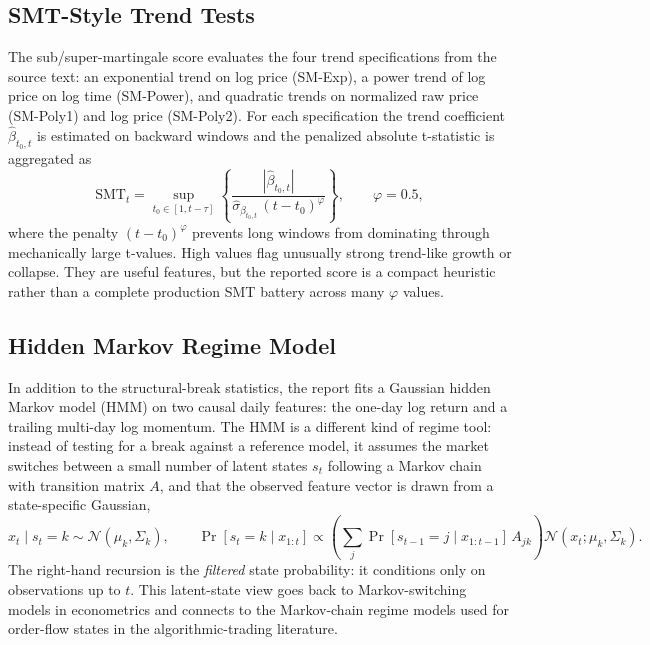 \documentclass[11pt]{article}
\begin{document}
\subsection{SMT-Style Trend Tests}

The sub/super-martingale score evaluates the four trend specifications from the source text: an exponential trend on log price (SM-Exp), a power trend of log price on log time (SM-Power), and quadratic trends on normalized raw price (SM-Poly1) and log price (SM-Poly2). For each specification the trend coefficient $\hat\beta_{t_0,t}$ is estimated on backward windows and the penalized absolute t-statistic is aggregated as
\[
    \mathrm{SMT}_t = \sup_{t_0 \in [1, t-\tau]}
    \left\{ \frac{\left|\hat\beta_{t_0,t}\right|}{\hat\sigma_{\beta_{t_0,t}}\,(t - t_0)^{\varphi}} \right\},
    \qquad \varphi = 0.5,
\]
where the penalty $(t-t_0)^{\varphi}$ prevents long windows from dominating through mechanically large t-values. High values flag unusually strong trend-like growth or collapse. They are useful features, but the reported score is a compact heuristic rather than a complete production SMT battery across many $\varphi$ values.

\subsection{Hidden Markov Regime Model}

In addition to the structural-break statistics, the report fits a Gaussian hidden Markov model (HMM) on two causal daily features: the one-day log return and a trailing multi-day log momentum. The HMM is a different kind of regime tool: instead of testing for a break against a reference model, it assumes the market switches between a small number of latent states $s_t$ following a Markov chain with transition matrix $A$, and that the observed feature vector is drawn from a state-specific Gaussian,
\[
    x_t \mid s_t = k \sim \mathcal{N}(\mu_k, \Sigma_k),
    \qquad
    \Pr[s_t = k \mid x_{1:t}] \propto
    \left( \textstyle\sum_j \Pr[s_{t-1} = j \mid x_{1:t-1}]\, A_{jk} \right) \mathcal{N}(x_t; \mu_k, \Sigma_k).
\]
The right-hand recursion is the \emph{filtered} state probability: it conditions only on observations up to $t$. This latent-state view goes back to Markov-switching models in econometrics and connects to the Markov-chain regime models used for order-flow states in the algorithmic-trading literature.
\end{document}

